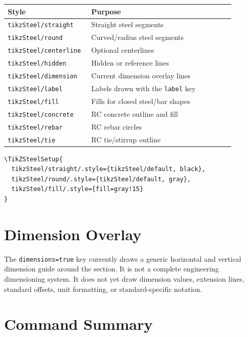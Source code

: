 \documentclass[10pt]{article}
\newcommand{\keyname}[1]{\texttt{#1}}
\begin{document}
\begin{longtable}{p{0.28\linewidth}p{0.60\linewidth}}
\toprule
Style & Purpose \\
\midrule
\keyname{tikzSteel/straight} & Straight steel segments \\
\keyname{tikzSteel/round} & Curved/radius steel segments \\
\keyname{tikzSteel/centerline} & Optional centerlines \\
\keyname{tikzSteel/hidden} & Hidden or reference lines \\
\keyname{tikzSteel/dimension} & Current dimension overlay lines \\
\keyname{tikzSteel/label} & Labels drawn with the \keyname{label} key \\
\keyname{tikzSteel/fill} & Fills for closed steel/bar shapes \\
\keyname{tikzSteel/concrete} & RC concrete outline and fill \\
\keyname{tikzSteel/rebar} & RC rebar circles \\
\keyname{tikzSteel/tie} & RC tie/stirrup outline \\
\bottomrule
\end{longtable}

\begin{lstlisting}
\TikZSteelSetup{
  tikzSteel/straight/.style={tikzSteel/default, black},
  tikzSteel/round/.style={tikzSteel/default, gray},
  tikzSteel/fill/.style={fill=gray!15}
}
\end{lstlisting}

\section{Dimension Overlay}

The \keyname{dimensions=true} key currently draws a generic horizontal and
vertical dimension guide around the section. It is not a complete engineering
dimensioning system. It does not yet draw dimension values, extension lines,
standard offsets, unit formatting, or standard-specific notation.

\section{Command Summary}
\end{document}
